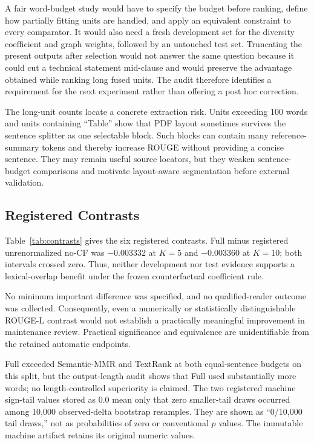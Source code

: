 \documentclass[applsci,article,submit,moreauthors]{Definitions/mdpi}
\begin{document}
A fair word-budget study would have to specify the budget before ranking, define how partially fitting units are handled, and apply an equivalent constraint to every comparator. It would also need a fresh development set for the diversity coefficient and graph weights, followed by an untouched test set. Truncating the present outputs after selection would not answer the same question because it could cut a technical statement mid-clause and would preserve the advantage obtained while ranking long fused units. The audit therefore identifies a requirement for the next experiment rather than offering a post hoc correction.

The long-unit counts locate a concrete extraction risk. Units exceeding 100 words and units containing ``Table'' show that PDF layout sometimes survives the sentence splitter as one selectable block. Such blocks can contain many reference-summary tokens and thereby increase ROUGE without providing a concise sentence. They may remain useful source locators, but they weaken sentence-budget comparisons and motivate layout-aware segmentation before external validation.

\subsection{Registered Contrasts}

Table~\ref{tab:contrasts} gives the six registered contrasts. Full minus registered unrenormalized no-CF was $-0.003332$ at $K=5$ and $-0.003360$ at $K=10$; both intervals crossed zero. Thus, neither development nor test evidence supports a lexical-overlap benefit under the frozen counterfactual coefficient rule.

No minimum important difference was specified, and no qualified-reader outcome was collected. Consequently, even a numerically or statistically distinguishable ROUGE-L contrast would not establish a practically meaningful improvement in maintenance review. Practical significance and equivalence are unidentifiable from the retained automatic endpoints.

Full exceeded Semantic-MMR and TextRank at both equal-sentence budgets on this split, but the output-length audit shows that Full used substantially more words; no length-controlled superiority is claimed. The two registered machine sign-tail values stored as 0.0 mean only that zero smaller-tail draws occurred among 10,000 observed-delta bootstrap resamples. They are shown as ``0/10,000 tail draws,'' not as probabilities of zero or conventional $p$ values. The immutable machine artifact retains its original numeric values.
\end{document}
